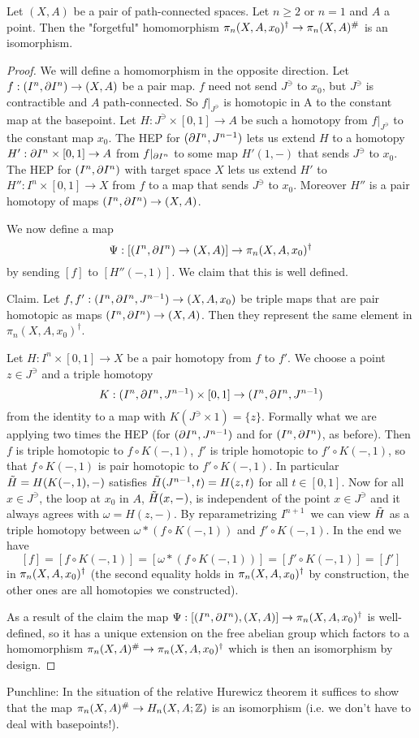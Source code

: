 \begin{proposition}
Let $(X,A)$ be a pair of path-connected spaces. Let $n\geq2$ or $n=1$ and $A$ a point. Then the "forgetful" homomorphism $\pi_n(X,A,x_0)^\dagger\to\pi_n(X,A)^\#$ is an isomorphism.
\end{proposition}

\begin{proof}
We will define a homomorphism in the opposite direction. Let $f:(I^n,\partial I^n)\to (X,A)$ be a pair map. $f$ need not send $J^\ni$ to $x_0$, but $J^\ni$ is contractible and $A$ path-connected. So $f|_{J^\ni}$ is homotopic in A to the constant map at the basepoint. Let $H:J^\ni\times[0,1]\to A$ be such a homotopy from $f|_{J^\ni}$ to the constant map $x_0$. The HEP for $(\partial I^n,J^{n-1})$ lets us extend $H$ to a homotopy $H':\partial I^n\times[0,1]\to A$ from $f|_{\partial I^n}$ to some map $H'(1,-)$ that sends $J^\ni$ to $x_0$. The HEP for $(I^n,\partial I^n)$ with target space $X$ lets us extend $H'$ to $H'':I^n\times[0,1]\to X$ from $f$ to a map that sends $J^\ni$ to $x_0$. Moreover $H''$ is a pair homotopy of maps $(I^n,\partial I^n)\to (X,A)$.

We now define a map \[\Psi:[(I^n,\partial I^n)\to (X,A)]\to \pi_n(X,A,x_0)^\dagger\]
by sending $[f]$ to $[H''(-,1)]$. We claim that this is well defined.
 
Claim. Let $f,f':(I^n,\partial I^n, J^{n-1})\to(X,A,x_0)$ be triple maps that are pair homotopic as maps $(I^n,\partial I^n)\to (X,A)$. Then they represent the same element in $\pi_n(X,A,x_0)^\dagger$.

\begin{claimproof}
Let $H:I^n\times[0,1]\to X$ be a pair homotopy from $f$ to $f'$. We choose a point $z\in J^\ni$ and a triple homotopy
\[K:(I^n,\partial I^n,J^{n-1})\times[0,1]\to(I^n,\partial I^n,J^{n-1})\]
from the identity to a map with $K(J^\ni\times 1)=\{z\}$. Formally what we are applying two times the HEP (for $(\partial I^n,J^{n-1})$ and for $(I^n,\partial I^n)$, as before). Then $f$ is triple homotopic to $f\circ K(-,1)$, $f'$ is triple homotopic to $f'\circ K(-,1)$, so that $f\circ K(-,1)$ is pair homotopic to $f'\circ K(-,1)$. In particular $\tilde{H}=H(K(-,1),-)$ satisfies $\tilde{H}(J^{n-1},t)=H(z,t)$ for all $t\in [0,1]$. Now for all $x\in J^\ni$, the loop at $x_0$ in $A$, $\tilde{H}(x,-)$, is independent of the point $x\in J^\ni$ and it always agrees with $\omega=H(z,-)$. By reparametrizing $I^{n+1}$\alvaropls\ we can view $\tilde{H}$ as a triple homotopy between $\omega * (f\circ K(-,1))$ and $f'\circ K(-,1)$. In the end we have
\[[f]=[f\circ K(-,1)]=[\omega * (f\circ K(-,1))]=[f'\circ K(-,1)]=[f']\] in $\pi_n(X,A,x_0)^\dagger$ (the second equality holds in $\pi_n(X,A,x_0)^\dagger$ by construction, the other ones are all homotopies we constructed).
\end{claimproof}

As a result of the claim the map $\Psi:[(I^n,\partial I^n),(X,A)]\to\pi_n(X,A,x_0)^\dagger$ is well-defined, so it has a unique extension on the free abelian group which factors to a homomorphism $\pi_n(X,A)^\#\to\pi_n(X,A,x_0)^\dagger$ which is then an isomorphism by design.
\end{proof}
 
Punchline: In the situation of the relative Hurewicz theorem it suffices to show that the map $\pi_n(X,A)^\#\to H_n(X,A;{\mathbb Z})$ is an isomorphism (i.e. we don't have to deal with basepoints!).
